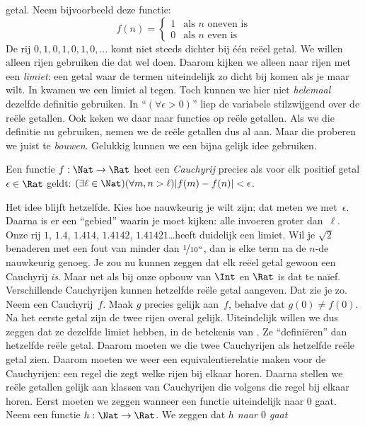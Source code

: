 \documentclass[openany]{memoir}
\begin{document}
getal. Neem bijvoorbeeld deze functie:
\[
	f(n) =\begin{cases}
			1 & \text{als }n\text{ oneven is}\\
			0 &\text{als }n\text{ even is}
		\end{cases}
\]
De rij $0,1,0,1,0,1,0,\ldots$ komt niet steeds dichter bij één reëel
getal. We willen alleen rijen gebruiken die dat wel doen. Daarom kijken
we alleen naar rijen met een \emph{limiet}: een getal waar de termen
uiteindelijk zo dicht bij komen als je maar wilt.
In  kwamen we een limiet al tegen. Toch
kunnen we hier niet \emph{helemaal} dezelfde definitie gebruiken. In
``$(\forall \epsilon>0)$'' liep de variabele stilzwijgend over de reële
getallen. Ook keken we daar naar functies op reële getallen. Als we die
definitie nu gebruiken, nemen we de reële getallen dus al aan. Maar die
proberen we juist te \emph{bouwen}. Gelukkig kunnen we een bijna gelijk
idee gebruiken.
\begin{defn}
  Een functie $f: \Nat \to \Rat$ heet een \emph{Cauchyrij} precies als
  voor elk positief getal $\epsilon \in \Rat$ geldt: $(\exists \ell
  \in \Nat)(\forall m, n > \ell)|f(m) - f(n)| < \epsilon$.
\end{defn}
Het idee blijft hetzelfde. Kies hoe nauwkeurig je wilt zijn; dat meten
we met~$\epsilon$. Daarna is er een ``gebied'' waarin je moet kijken:
alle invoeren groter dan~$\ell$. Onze rij $1$, $1.4$, $1.414$,
$1.4142$, $1.41421$\ldots heeft duidelijk een limiet. Wil je
$\sqrt{2}$ benaderen met een fout van minder dan
$\nicefrac{1}{10^{n}}$, dan is elke term na de $n$-de nauwkeurig genoeg.
Je zou nu kunnen zeggen dat elk reëel getal gewoon een Cauchyrij
\emph{is}. Maar net als bij onze opbouw van $\Int$ en $\Rat$ is dat te
na\"ief. Verschillende Cauchyrijen kunnen hetzelfde reële getal
aangeven. Dat zie je zo. Neem een Cauchyrij~$f$. Maak $g$ precies gelijk
aan~$f$, behalve dat $g(0)\neq f(0)$. Na het eerste getal zijn de twee
rijen overal gelijk. Uiteindelijk willen we dus zeggen dat ze dezelfde
limiet hebben, in de betekenis van . Ze
``definiëren'' dan hetzelfde reële getal. Daarom moeten we die twee
Cauchyrijen als hetzelfde reële getal zien.
Daarom moeten we weer een equivalentierelatie maken voor de
Cauchyrijen: een regel die zegt welke rijen bij elkaar horen. Daarna
stellen we reële getallen gelijk aan klassen van Cauchyrijen die volgens
die regel bij elkaar horen. Eerst moeten
we zeggen wanneer een functie uiteindelijk naar $0$ gaat. Neem een
functie $h : \Nat \to \Rat$. We zeggen dat \emph{$h$ naar $0$ gaat}
\end{document}
